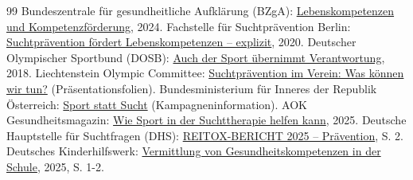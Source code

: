 \documentclass[11pt,a4paper]{article}
\begin{document}
\begin{thebibliography}{99}
		 Bundeszentrale für gesundheitliche Aufklärung (BZgA): \href{https://leitbegriffe.bioeg.de/alphabetisches-verzeichnis/lebenskompetenzen-und-kompetenzfoerderung/}{Lebenskompetenzen und Kompetenzförderung}, 2024.
		 Fachstelle für Suchtprävention Berlin: \href{https://www.berlin-suchtpraevention.de/corona-krise-3-suchtpraevention-lebenskompetenz/}{Suchtprävention fördert Lebenskompetenzen – explizit}, 2020.
		 Deutscher Olympischer Sportbund (DOSB): \href{https://www.dosb.de/aktuelles/news/detail/auch-der-sport-uebernimmt-verantwortung}{Auch der Sport übernimmt Verantwortung}, 2018.
		 Liechtenstein Olympic Committee: \href{https://www.olympic.li/download_file/view/297/526}{Suchtprävention im Verein: Was können wir tun?} (Präsentationsfolien).
		 Bundesministerium für Inneres der Republik Österreich: \href{https://www.bmi.gv.at}{Sport statt Sucht} (Kampagneninformation).
		 AOK Gesundheitsmagazin: \href{https://www.aok.de/pk/magazin/koerper-psyche/sucht/wie-sport-in-der-suchttherapie-helfen-kann/}{Wie Sport in der Suchttherapie helfen kann}, 2025.
		 Deutsche Hauptstelle für Suchtfragen (DHS): \href{https://www.dhs.de/fileadmin/user_upload/pdf/Unsere_Arbeit/REITOX_BERICHT_2025_DE_WB_04_Praevention.pdf}{REITOX-BERICHT 2025 – Prävention}, S. 2.
		 Deutsches Kinderhilfswerk: \href{https://www.dkhw.de/filestorage/1_Informieren/1.1_Unsere_Themen/Kinderrechte/Kinderrechte-Index/2025/Indikatoren_Datengrundlage/Gesundheit/Vermittlung_von_Gesundheitskompetenzen_in_der_Schule_Auswertung.pdf}{Vermittlung von Gesundheitskompetenzen in der Schule}, 2025, S. 1-2.
	\end{thebibliography}
\end{document}
